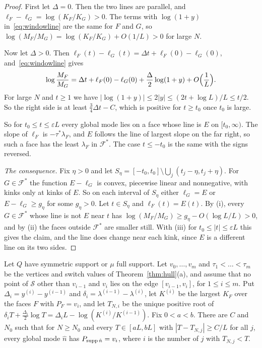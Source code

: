 \begin{proof}
First let $\Delta=0$. Then the two lines are parallel, and $\ell_F-\ell_G=\log(K_F/K_G)>0$. The
terms with $\log(1+y)$ in~\eqref{eq:windowline} are the same for $F$ and $G$, so
$\log(M_F/M_G)=\log(K_F/K_G)+O(1/L)>0$ for large $N$.

Now let $\Delta>0$. Then $\ell_F(t)-\ell_G(t)=\Delta t+\ell_F(0)-\ell_G(0)$,
and~\eqref{eq:windowline} gives
\[
\log\frac{M_F}{M_G}=\Delta t+\ell_F(0)-\ell_G(0)+\frac\Delta2\log(1+y)+O\Bigl(\frac1L\Bigr).
\]
For large $N$ and $t\ge1$ we have $|\log(1+y)|\le2|y|\le(2t+\log L)/L\le t/2$. So the right
side is at least $\frac34\Delta t-C$, which is positive for $t\ge t_0$ once $t_0$ is large.

So for $t_0\le t\le\varepsilon L$ every global mode lies on a face whose line is $E$ on
$[t_0,\infty)$. The slope of $\ell_F$ is $-\tau^*\lambda_F$, and $E$ follows the line of largest
slope on the far right, so such a face has the least $\lambda_F$ in $\mathcal F^*$. The case
$t\le-t_0$ is the same with the signs reversed.

\emph{The consequence.} Fix $\eta>0$ and let
$S_\eta=[-t_0,t_0]\setminus\bigcup_j(t_j-\eta,t_j+\eta)$. For $G\in\mathcal F^*$ the function
$E-\ell_G$ is convex, piecewise linear and nonnegative, with kinks only at kinks of $E$. So on
each interval of $S_\eta$ either $\ell_G=E$ or $E-\ell_G\ge g_\eta$ for some $g_\eta>0$. Let
$t\in S_\eta$ and $\ell_F(t)=E(t)$. By (i), every $G\in\mathcal F^*$ whose line is not $E$ near
$t$ has $\log(M_F/M_G)\ge g_\eta-O(\log L/L)>0$, and by (ii) the faces outside $\mathcal F^*$
are smaller still. With (iii) for $t_0\le|t|\le\varepsilon L$ this gives the claim, and the line
does change near each kink, since $E$ is a different line on its two sides.
\end{proof}


\begin{corollary}\label{cor:mode-changes}
Let $Q$ have symmetric support or $\mu$ full support. Let $v_0,\dots,v_m$ and
$\tau_1<\dots<\tau_m$ be the vertices and switch values of Theorem~\ref{thm:hull}(a), and
assume that no point of $\mathcal S$ other than $v_{i-1}$ and $v_i$ lies on the edge
$[v_{i-1},v_i]$, for $1\le i\le m$. Put $\Delta_i=y^{(i)}-y^{(i-1)}$ and
$\delta_i=\lambda^{(i-1)}-\lambda^{(i)}$, let $K^{(i)}$ be the largest $K_F$ over the faces
$F$ with $P_F=v_i$, and let $T_{N,i}$ be the unique positive root of
$\delta_iT+\frac{\Delta_i}2\log T=\Delta_iL-\log(K^{(i)}/K^{(i-1)})$. Fix $0<a<b$. There are
$C$ and $N_0$ such that for $N\ge N_0$ and every $T\in[aL,bL]$ with $|T-T_{N,j}|\ge C/L$ for
all $j$, every global mode $\hat n$ has $P_{\operatorname{supp}\hat n}=v_i$, where $i$ is the number of $j$
with $T_{N,j}<T$.
\end{corollary}

